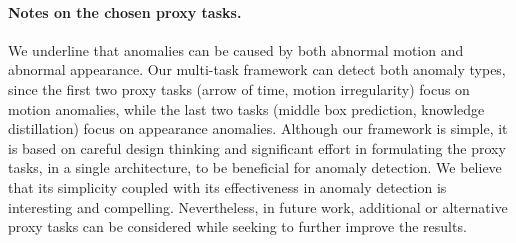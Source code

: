 \documentclass[final]{cvpr}
\begin{document}
\paragraph{Notes on the chosen proxy tasks.}
We underline that anomalies can be caused by both abnormal motion and abnormal appearance. Our multi-task framework can detect both anomaly types, since the first two proxy tasks (arrow of time, motion irregularity) focus on motion anomalies, while the last two tasks (middle box prediction, knowledge distillation) focus on appearance anomalies. Although our framework is simple, it is based on careful design thinking and significant effort in formulating the proxy tasks, in a single architecture, to be beneficial for anomaly detection. We believe that its simplicity coupled with its effectiveness in anomaly detection is interesting and compelling. Nevertheless, in future work, additional or alternative proxy tasks can be considered while seeking to further improve the results.
\end{document}
